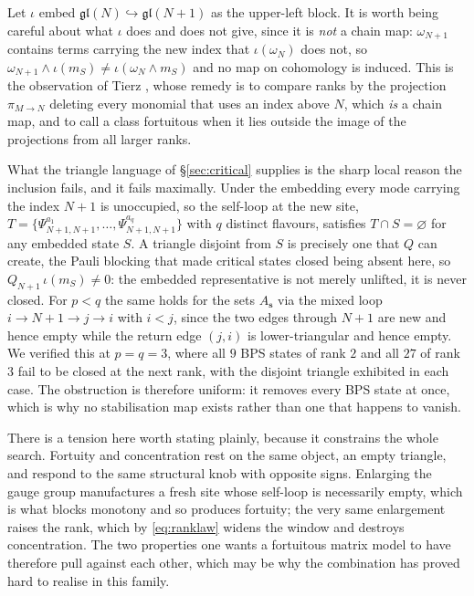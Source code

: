 \documentclass[10pt]{article}
\newcommand{\gl}{\mathfrak{gl}}
\begin{document}
Let $\iota$ embed $\gl(N)\hookrightarrow\gl(N+1)$ as the upper-left block. It is worth being careful about what
$\iota$ does and does not give, since it is \emph{not} a chain map: $\omega_{N+1}$ contains terms carrying the
new index that $\iota(\omega_N)$ does not, so $\omega_{N+1}\wedge\iota(m_S)\ne\iota(\omega_N\wedge m_S)$ and no
map on cohomology is induced. This is the observation of Tierz \cite{Tierz}, whose remedy is to compare ranks by
the projection $\pi_{M\to N}$ deleting every monomial that uses an index above $N$, which \emph{is} a chain map,
and to call a class fortuitous when it lies outside the image of the projections from all larger ranks.

What the triangle language of \S\ref{sec:critical} supplies is the sharp local reason the inclusion fails, and
it fails maximally. Under the embedding every mode carrying the index $N+1$ is unoccupied, so the self-loop at
the new site, $T=\{\Psi^{a_1}_{N+1,N+1},\dots,\Psi^{a_q}_{N+1,N+1}\}$ with $q$ distinct flavours, satisfies
$T\cap S=\varnothing$ for any embedded state $S$. A triangle disjoint from $S$ is precisely one that $Q$ can
create, the Pauli blocking that made critical states closed being absent here, so $Q_{N+1}\,\iota(m_S)\ne0$:
the embedded representative is not merely unlifted, it is never closed. For $p<q$ the same holds for the sets
$A_{\mathbf s}$ via the mixed loop $i\to N+1\to j\to i$ with $i<j$, since the two edges through $N+1$ are new
and hence empty while the return edge $(j,i)$ is lower-triangular and hence empty. We verified this at
$p=q=3$, where all $9$ BPS states of rank $2$ and all $27$ of rank $3$ fail to be closed at the next rank, with
the disjoint triangle exhibited in each case. The obstruction is therefore uniform: it removes every BPS state
at once, which is why no stabilisation map exists rather than one that happens to vanish.

There is a tension here worth stating plainly, because it constrains the whole search. Fortuity and
concentration rest on the same object, an empty triangle, and respond to the same structural knob with opposite
signs. Enlarging the gauge group manufactures a fresh site whose self-loop is necessarily empty, which is what
blocks monotony and so produces fortuity; the very same enlargement raises the rank, which by
\eqref{eq:ranklaw} widens the window and destroys concentration. The two properties one wants a fortuitous
matrix model to have therefore pull against each other, which may be why the combination has proved hard to
realise in this family.
\end{document}
